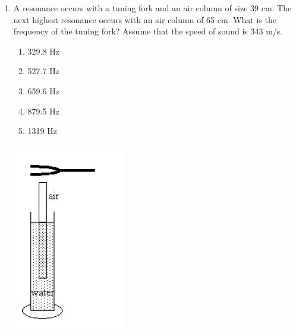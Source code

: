\documentclass[12pt, a4paper]{article}
\begin{document}
\begin{CJK*}{UTF8}{gbsn}
\begin{enumerate}[itemsep=1.0em, topsep=0.6em]
\item \label{prob:3}
\noindent\begin{minipage}[t]{0.6\linewidth}
\vspace{0pt} %
A resonance occurs with a tuning fork and an air column of size 39 cm. The next highest resonance occurs with an air column of 65 cm. What is the frequency of the tuning fork? Assume that the speed of sound is 343 m/s.
\begin{enumerate}[label=(\Alph*)]
    \item 329.8 Hz
    \item 527.7 Hz
    \item 659.6 Hz
    \item 879.5 Hz
    \item 1319 Hz
\end{enumerate}
\end{minipage}%
\hfill
\begin{minipage}[t]{0.33\linewidth}
\vspace{0pt} %
\centering
\includegraphics[width=0.7\linewidth]{Problem_03_Figure.png}
\end{minipage}


\end{enumerate}
\end{CJK*}
\end{document}
